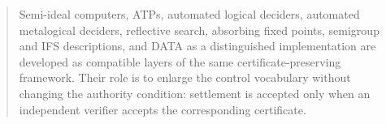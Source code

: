 \documentclass[11pt]{article}
\theoremstyle{remark}
\begin{document}
\begin{abstract}
Semi-ideal computers, ATPs, automated logical deciders, automated metalogical deciders, reflective search, absorbing fixed points, semigroup and IFS descriptions, and DATA as a distinguished implementation are developed as compatible layers of the same certificate-preserving framework. Their role is to enlarge the control vocabulary without changing the authority condition: settlement is accepted only when an independent verifier accepts the corresponding certificate.
\end{abstract}

\tableofcontents
\clearpage














\end{document}
